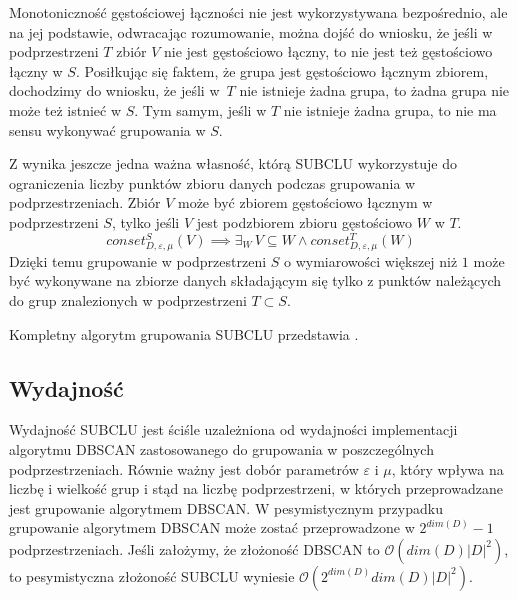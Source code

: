 Monotoniczność gęstościowej łączności nie jest wykorzystywana bezpośrednio, ale na jej podstawie, odwracając rozumowanie, można dojść do wniosku, że jeśli w podprzestrzeni $ T $ zbiór $ V $ nie jest gęstościowo łączny, to nie jest też gęstościowo łączny w $ S $. Posiłkując się faktem, że grupa jest gęstościowo łącznym zbiorem, dochodzimy do wniosku, że jeśli \mbox{w $ T $} nie istnieje żadna grupa, to żadna grupa nie może też istnieć w $ S $. Tym samym, jeśli w $ T $ nie istnieje żadna grupa, to nie ma sensu wykonywać grupowania w $ S $.

Z  wynika jeszcze jedna ważna własność, którą SUBCLU wykorzystuje do ograniczenia liczby punktów zbioru danych podczas grupowania w podprzestrzeniach. Zbiór $ V $ może być zbiorem gęstościowo łącznym w podprzestrzeni $ S $, tylko jeśli $ V $ jest podzbiorem zbioru gęstościowo  $ W $ w $ T $.
\begin{equation}
 conset^S_{D,\varepsilon,\mu}(V) \implies \exists_W\,V\subseteq W \land conset^T_{D,\varepsilon,\mu}(W)
\end{equation}
Dzięki temu grupowanie w podprzestrzeni $ S $ o wymiarowości większej niż $ 1 $ może być wykonywane na zbiorze danych składającym się tylko z punktów należących do grup znalezionych w podprzestrzeni $ T \subset S $.

Kompletny algorytm grupowania SUBCLU przedstawia .



\subsection{Wydajność}
Wydajność SUBCLU jest ściśle uzależniona od wydajności implementacji algorytmu DBSCAN zastosowanego do grupowania w poszczególnych podprzestrzeniach. Równie ważny jest dobór parametrów $ \varepsilon $ i $ \mu $, który wpływa na liczbę i wielkość grup i stąd na liczbę podprzestrzeni, w których przeprowadzane jest grupowanie algorytmem DBSCAN. W pesymistycznym przypadku grupowanie algorytmem DBSCAN może zostać przeprowadzone w $ 2^{dim(D)}-1 $ podprzestrzeniach. Jeśli założymy, że złożoność DBSCAN to $\mathcal{O}( dim(D)|D|^2 )$, to pesymistyczna złożoność SUBCLU wyniesie $ \mathcal{O}(2^{dim(D)}dim(D)|D|^2) $.